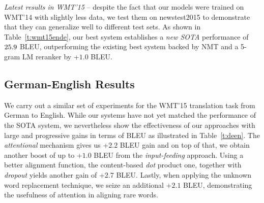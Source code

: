{\it Latest results in WMT'15} -- despite the fact that our models were trained
on WMT'14 with slightly less data, we test them on newstest2015 to demonstrate
that they can generalize well to different test sets. As shown in Table~\ref{t:wmt15ende}, our best
system establishes a {\it new SOTA} performance of $25.9{}$ BLEU,
outperforming the existing best system backed by NMT and a 5-gram LM reranker
by +$1.0$
BLEU.

\subsection{German-English Results}
We carry out a similar set of experiments for the WMT'15 translation task from German
to English. 
While our systems have not yet matched the performance of the 
SOTA system, we nevertheless show the effectiveness of our
approaches with large and progressive gains in terms of BLEU as illustrated in
Table~\ref{t:deen}. 
The {\it attentional} mechanism gives us +$2.2$ BLEU gain and on top of that, we
obtain another boost of up to +$1.0$ BLEU from the {\it input-feeding} approach.
Using a better alignment function, the content-based {\it dot} product one,
together with {\it dropout} yields another gain of +$2.7$ BLEU. Lastly, when
applying the unknown word replacement technique, we seize an additional +$2.1$
BLEU, demonstrating the usefulness of attention in aligning rare words.
